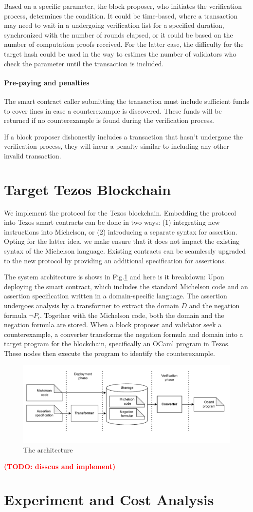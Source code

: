 \documentclass[runningheads]{llncs}
\newcommand{\todo}[1]{\textbf{\textcolor{red}{(TODO: #1)}}}
\begin{document}
Based on a specific parameter, the block proposer, who initiates the verification process, determines the condition. It could be time-based, where a transaction may need to wait in a undergoing verification list for a specified duration, synchronized with the number of rounds elapsed, or it could be based on the number of computation proofs received. For the latter case,  the difficulty for the target hash could be used in the way to estimes the number of validators who check the parameter until the transaction is included.

\paragraph{Pre-paying and penalties} The smart contract caller submitting the transaction must include sufficient funds to cover fines in case a counterexample is discovered. These funds will be returned if no counterexample is found during the verification process.

If a block proposer dishonestly includes a transaction that hasn't undergone the verification process, they will incur a penalty similar to including any other invalid transaction.

\section{Target Tezos Blockchain}
\label{sec:tezos}
We implement the protocol for the Tezos blockchain. Embedding the protocol into Tezos smart contracts can be done in two ways: (1) integrating new instructions into Michelson, or (2) introducing a separate syntax for assertion. Opting for the latter idea, we make ensure that it does not impact the existing syntax of the Michelson language. Existing contracts can be seamlessly upgraded to the new protocol by providing an additional specification for assertions.

The system architecture is shows in Fig.\ref{fig.architect} and here is it breakdown: Upon deploying the smart contract, which includes the standard Michelson code and an assertion specification written in a domain-specific language. The assertion undergoes analysis by a transformer to extract the domain $D$ and the negation formula $\neg P_i$. Together with the Michelson code, both the domain and the negation formula are stored. When a block proposer and validator seek a counterexample, a converter transforms the negation formula and domain into a target program for the blockchain, specifically an OCaml program in Tezos. These nodes then execute the program to identify the counterexample.

\begin{figure}
\centering
\includegraphics[scale=0.65]{assertion-tezos}
\caption{The architecture}
\label{fig.architect}
\end{figure}
\todo{disscus and implement}
\section{Experiment and Cost Analysis}
\label{sec:cost-analysis}
\end{document}

